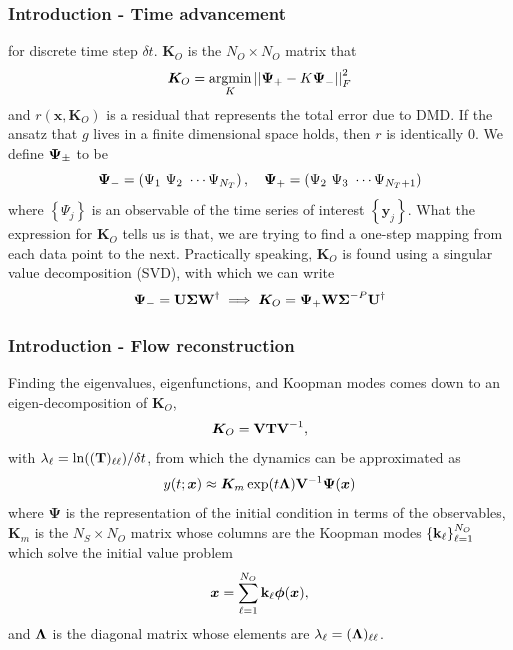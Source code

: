 \documentclass[11pt,aspectratio=169]{beamer}
\newcommand{\norm}[1]{\left|\left|#1\right|\right|}
\newcommand{\parens}[1]{\left(#1\right)}
\newcommand{\bracks}[1]{\left\{#1\right\}}
\begin{document}
    \begin{frame}
        \frametitle{Introduction - Time advancement}
        for discrete time step $\delta t$. $\boldsymbol{K}_O$ is the $N_O\times N_O$ matrix that 
        \begin{equation}
            \boldsymbol{K}_O = \underset{K}{\text{argmin}}\norm{{\bf\Psi}_+ - K{\bf\Psi}_-}_F^2
        \end{equation}
        and $r(\boldsymbol{x}, \boldsymbol{K}_O)$ is a residual that represents the 
        total error due to DMD. If the ansatz that $g$ lives in a finite dimensional space holds, 
        then $r$ is identically 0. We define ${\bf\Psi}_\pm$ to be
        \begin{equation}
            {\bf\Psi}_- = \parens{\Psi_1\ \Psi_2\ \cdots \Psi_{N_T}},\quad {\bf\Psi}_+ = \parens{
            \Psi_2\ \Psi_3\ \cdots \Psi_{N_T+1}} 
        \end{equation}
        where $\bracks{\Psi_j}$ is an observable of the time series of interest 
        $\bracks{\boldsymbol{y}_j}$. What the expression for $\boldsymbol{K}_O$ tells 
        us is that, we are trying to find a one-step mapping from each data point
        to the next. Practically speaking, $\boldsymbol{K}_O$ is found
        using a singular value decomposition (SVD), with which we can write
        \begin{equation}
            {\bf\Psi}_- = {\bf U\Sigma W}^{\dagger} \implies \boldsymbol{K}_O = 
            {\bf\Psi}_+{\bf W\Sigma}^{-P}{\bf U}^{\dagger}
        \end{equation}
    \end{frame}

    \begin{frame}
        \frametitle{Introduction - Flow reconstruction}
        Finding the eigenvalues, eigenfunctions, and Koopman modes comes down to an 
        eigen-decomposition of $\boldsymbol{K}_O$,
        \begin{equation}
            \boldsymbol{K}_O = {\bf VTV}^{-1}, 
        \end{equation}
        with $\lambda_\ell = \ln(({\bf T})_{\ell\ell})/\delta t$,
        from which the dynamics can be approximated as 
        \begin{equation}
            y(t;\boldsymbol{x}) \approx \boldsymbol{K}_m\exp(t{\bf\Lambda}){\bf V}^{-1}\boldsymbol{\Psi}(\boldsymbol{x}) 
        \end{equation}
        where $\boldsymbol{\Psi}$ is the representation of the initial condition in terms of the observables, 
        $\boldsymbol{K}_m$ is the $N_S \times N_O$ matrix whose columns are the Koopman modes 
        $\bracks{{\bf k}_\ell}_{\ell=1}^{N_O}$ which solve the initial value problem
        \begin{equation}
            \boldsymbol{x} = \sum_{\ell=1}^{N_O}{\bf k}_\ell\boldsymbol{\phi}(\boldsymbol{x}),
        \end{equation}
        and ${\bf \Lambda}$ is the diagonal matrix whose elements are $\lambda_\ell
        = ({\bf \Lambda})_{\ell\ell}$.
    \end{frame}
\end{document}
